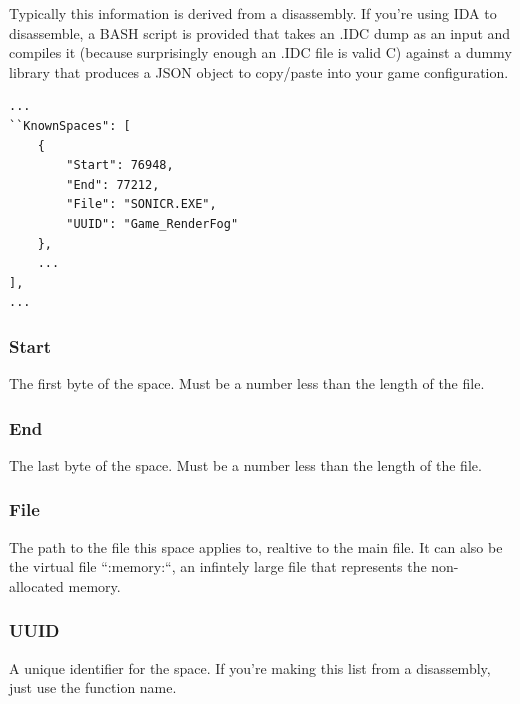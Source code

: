 \documentclass[12pt,a4paper,notitlepage]{article}
\begin{document}
Typically this information is derived from a disassembly. If you're using IDA to disassemble, a BASH script is provided that takes an .IDC dump as an input and compiles it (because surprisingly enough an .IDC file is valid C) against a dummy library that produces a JSON object to copy/paste into your game configuration.

\begin{lstlisting}
...
``KnownSpaces": [
    {
        "Start": 76948,
        "End": 77212,
        "File": "SONICR.EXE",
        "UUID": "Game_RenderFog"
    },
    ...
],
...
\end{lstlisting}

\subsubsection{Start}
The first byte of the space. Must be a number less than the length of the file.

\subsubsection{End}
The last byte of the space. Must be a number less than the length of the file.

\subsubsection{File}
The path to the file this space applies to, realtive to the main file. It can also be the virtual file ``:memory:``, an infintely large file that represents the non-allocated memory.

\subsubsection{UUID}
A unique identifier for the space. If you're making this list from a disassembly, just use the function name.
\end{document}
